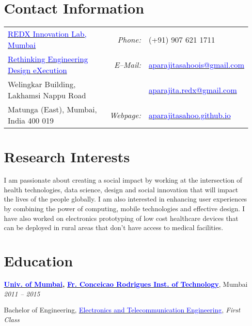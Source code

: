 \documentclass[margin,line]{res}
\newenvironment{list1}{
  \begin{list}{\ding{113}}{%
      \setlength{\itemsep}{0in}
      \setlength{\parsep}{0in} \setlength{\parskip}{0in}
      \setlength{\topsep}{0in} \setlength{\partopsep}{0in} 
      \setlength{\leftmargin}{0.17in}}}{\end{list}}
\begin{document}

\begin{resume}
\section{\sc Contact Information}
\vspace{.05in}
\begin{tabular}{@{}p{2.9in}p{.5in}p{3in}}
\href{https://redxmumbai.com/}{\textcolor{blue} {REDX Innovation Lab, Mumbai}} & \multicolumn{1}{r}{\it Phone:}  &(+91) 907 621 1711 \\           
\href{http://redx.io/}{\textcolor{blue} {Rethinking Engineering Design eXecution}} &\multicolumn{1}{r}{\it E--Mail:}& \href{mailto:aparajitasahoois@gmail.com}{\textcolor{blue}{aparajitasahoois@gmail.com}} \\ 
Welingkar Building, Lakhamsi Nappu Road & & \href{mailto:aparajita.redx@gmail.com}{\textcolor{blue}{aparajita.redx@gmail.com}} \\ 
Matunga (East), Mumbai, India 400 019 & \multicolumn{1}{r}{\it Webpage:} &\href{http://aparajitasahoo.github.io/}{\textcolor{blue}{aparajitasahoo.github.io}} \\     
\end{tabular}

\section{\sc Research Interests}
\lettrine[lines=2]{I}{} am passionate about creating a social impact by working at the intersection of health technologies, data science, design and social innovation that will impact the lives of the people globally. I am also interested in enhancing  user experiences by combining the power of computing, mobile technologies and effective design. I have also worked on electronics prototyping of low cost healthcare devices that can be deployed in rural areas that don’t have access to medical facilities.  

\section{\sc Education}
{\bf \href{http://mu.ac.in/portal/}{\textcolor{blue}{Univ. of Mumbai}}, \href{http://fcrit.ac.in/}{\textcolor{blue}{Fr. Conceicao Rodrigues Inst. of Technology}}}, Mumbai \hfill {\it 2011 -- 2015} \\
\vspace*{-.15in}
\begin{list1}
\item[] Bachelor of Engineering, \href{http://www.extc.fcrit.ac.in/}{\textcolor{blue}{Electronics and Telecommunication Engineering}}, \textit{First Class}
\end{list1}


\end{resume}
\end{document}

